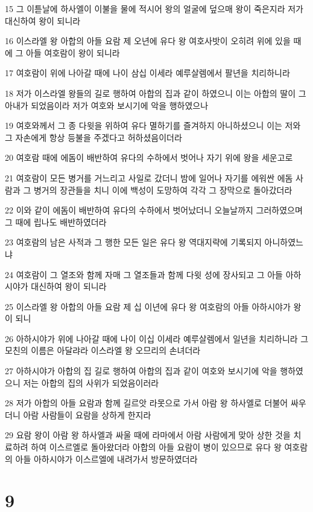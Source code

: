 \par 15 그 이튿날에 하사엘이 이불을 물에 적시어 왕의 얼굴에 덮으매 왕이 죽은지라 저가 대신하여 왕이 되니라
\par 16 이스라엘 왕 아합의 아들 요람 제 오년에 유다 왕 여호사밧이 오히려 위에 있을 때에 그 아들 여호람이 왕이 되니라
\par 17 여호람이 위에 나아갈 때에 나이 삼십 이세라 예루살렘에서 팔년을 치리하니라
\par 18 저가 이스라엘 왕들의 길로 행하여 아합의 집과 같이 하였으니 이는 아합의 딸이 그 아내가 되었음이라 저가 여호와 보시기에 악을 행하였으나
\par 19 여호와께서 그 종 다윗을 위하여 유다 멸하기를 즐겨하지 아니하셨으니 이는 저와 그 자손에게 항상 등불을 주겠다고 허하셨음이더라
\par 20 여호람 때에 에돔이 배반하여 유다의 수하에서 벗어나 자기 위에 왕을 세운고로
\par 21 여호람이 모든 병거를 거느리고 사일로 갔더니 밤에 일어나 자기를 에워싼 에돔 사람과 그 병거의 장관들을 치니 이에 백성이 도망하여 각각 그 장막으로 돌아갔더라
\par 22 이와 같이 에돔이 배반하여 유다의 수하에서 벗어났더니 오늘날까지 그러하였으며 그 때에 립나도 배반하였더라
\par 23 여호람의 남은 사적과 그 행한 모든 일은 유다 왕 역대지략에 기록되지 아니하였느냐
\par 24 여호람이 그 열조와 함께 자매 그 열조들과 함께 다윗 성에 장사되고 그 아들 아하시야가 대신하여 왕이 되니라
\par 25 이스라엘 왕 아합의 아들 요람 제 십 이년에 유다 왕 여호람의 아들 아하시야가 왕이 되니
\par 26 아하시야가 위에 나아갈 때에 나이 이십 이세라 예루살렘에서 일년을 치리하니라 그 모친의 이름은 아달랴라 이스라엘 왕 오므리의 손녀더라
\par 27 아하시야가 아합의 집 길로 행하여 아합의 집과 같이 여호와 보시기에 악을 행하였으니 저는 아합의 집의 사위가 되었음이러라
\par 28 저가 아합의 아들 요람과 함께 길르앗 라못으로 가서 아람 왕 하사엘로 더불어 싸우더니 아람 사람들이 요람을 상하게 한지라
\par 29 요람 왕이 아람 왕 하사엘과 싸울 때에 라마에서 아람 사람에게 맞아 상한 것을 치료하려 하여 이스르엘로 돌아왔더라 아합의 아들 요람이 병이 있으므로 유다 왕 여호람의 아들 아하시야가 이스르엘에 내려가서 방문하였더라

\chapter{9}

